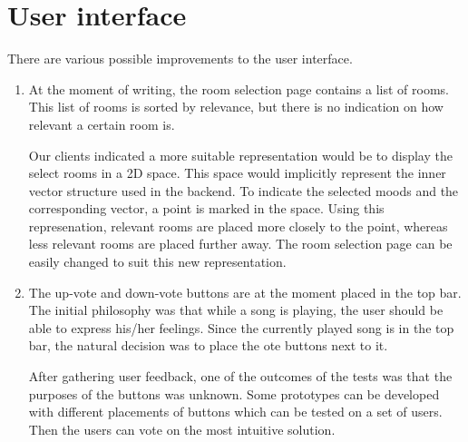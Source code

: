 \section{User interface}
There are various possible improvements to the user interface.

\begin{enumerate}
\item At the moment of writing, the room selection page contains a list of rooms.
This list of rooms is sorted by relevance, but there is no indication on how relevant a certain room is.

Our clients indicated a more suitable representation would be to display the select rooms in a 2D space.
This space would implicitly represent the inner vector structure used in the backend.
To indicate the selected moods and the corresponding vector, a point is marked in the space.
Using this represenation, relevant rooms are placed more closely to the point, whereas less relevant rooms are placed further away. The room selection page can be easily changed to suit this new representation.

\item The up-vote and down-vote buttons are at the moment placed in the top bar.
The initial philosophy was that while a song is playing, the user should be able to express his/her feelings.
Since the currently played song is in the top bar, the natural decision was to place the ote buttons next to it.

After gathering user feedback, one of the outcomes of the tests was that the purposes of the buttons was unknown.
Some prototypes can be developed with different placements of buttons which can be tested on a set of users.
Then the users can vote on the most intuitive solution.
\end{enumerate}
